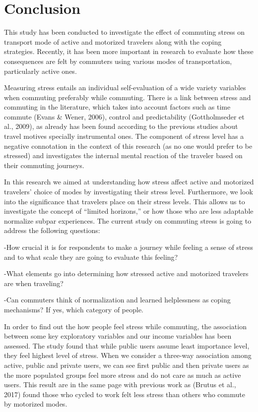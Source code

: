 \documentclass[
11pt, %
oneside, %
english, %
singlespacing, %
]{macthesis} %
\begin{document}
\hypertarget{conclusion}{%
\section{Conclusion}\label{conclusion}}

This study has been conducted to investigate the effect of commuting stress on transport mode of active and motorized travelers along with the coping strategies. Recently, it has been more important in research to evaluate how these consequences are felt by commuters using various modes of transportation, particularly active ones.

Measuring stress entails an individual self-evaluation of a wide variety variables when commuting preferably while commuting. There is a link between stress and commuting in the literature, which takes into account factors such as time commute (Evans \& Wener, 2006), control and predictability (Gottholmseder et al., 2009), as already has been found according to the previous studies about travel motives specially instrumental ones. The component of stress level has a negative connotation in the context of this research (as no one would prefer to be stressed) and investigates the internal mental reaction of the traveler based on their commuting journeys.

In this research we aimed at understanding how stress affect active and motorized travelers' choice of modes by investigating their stress level. Furthermore, we look into the significance that travelers place on their stress levels. This allows us to investigate the concept of ``limited horizons,'' or how those who are less adaptable normalize subpar experiences. The current study on commuting stress is going to address the following questions:

-How crucial it is for respondents to make a journey while feeling a sense of stress and to what scale they are going to evaluate this feeling?

-What elements go into determining how stressed active and motorized travelers are when traveling?

-Can commuters think of normalization and learned helplessness as coping mechanisms? If yes, which category of people.

In order to find out the how people feel stress while commuting, the association between some key exploratory variables and our income variables has been assessed. The study found that while public users assume least importance level, they feel highest level of stress. When we consider a three-way association among active, public and private users, we can see first public and then private users as the more populated groups feel more stress and do not care as much as active users. This result are in the same page with previous work as (Brutus et al., 2017) found those who cycled to work felt less stress than others who commute by motorized modes.
\end{document}
